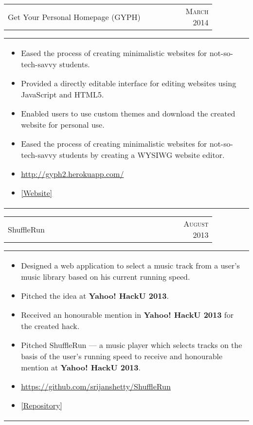 \documentclass[a4paper,10pt]{article} %
\newcommand{\iproject}[3]{
    \begin{tabular}{p{0.85\linewidth}r}
        \textcolor{NavyBlue}{#2} & \multicolumn{1}{m{3cm}}{\raggedleft \textsc{#1}}\\
    \end{tabular}
    \begin{tabular}{p{\linewidth}}
    \vspace{-0.3cm}
        \footnotesize{#3}
    \end{tabular}
    \vspace{-0.5cm}
}
\begin{document}
\iproject {March 2014}
          {Get Your Personal Homepage (GYPH)}
          {
               \begin{itemize}[leftmargin=0.5cm]
                   \item Eased the process of creating minimalistic websites for not-so-tech-savvy students.
                   \item Provided a directly editable interface for editing websites using JavaScript and HTML5.
                   \item Enabled users to use custom themes and download the created website for personal use.
                   \item Eased the process of creating minimalistic websites for not-so-tech-savvy students by creating a WYSIWG website
                       editor.
                   \item \href{http://gyph2.herokuapp.com/} {http://gyph2.herokuapp.com/}
                   \item \href{http://gyph2.herokuapp.com/} {[Website]}
               \end{itemize}
           }

\iproject {August 2013}
          {ShuffleRun}
          {
              \begin{itemize}[leftmargin=0.5cm]
                  \item Designed a web application to select a music track from a user's music library based on his current running speed.
                  \item Pitched the idea at \textbf{Yahoo! HackU 2013}.
                  \item Received an honourable mention in \textbf{Yahoo!  HackU 2013} for the created hack.
                  \item Pitched ShuffleRun --- a music player which selects tracks on the basis of the user's running speed to receive
                      and honourable mention at \textbf{Yahoo! HackU 2013}.
                  \item \href{https://github.com/srijanshetty/ShuffleRun} {https://github.com/srijanshetty/ShuffleRun}
                  \item \href{https://github.com/srijanshetty/ShuffleRun} {[Repository]}
              \end{itemize}
          }
\end{document}
